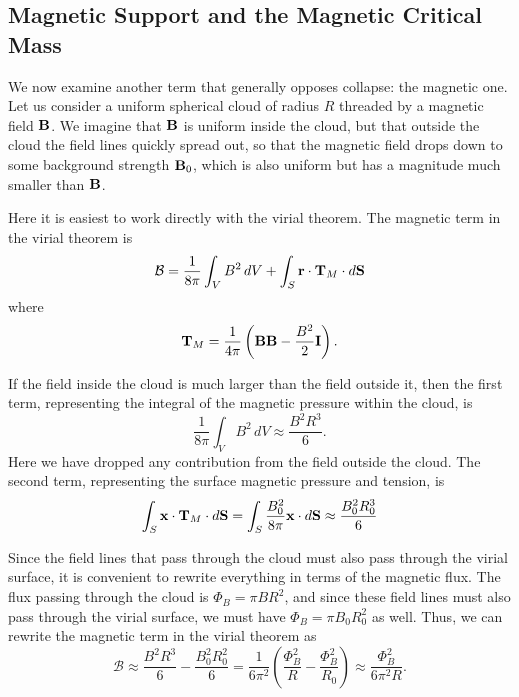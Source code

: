 \subsection{Magnetic Support and the Magnetic Critical Mass}

We now examine another term that generally opposes collapse: the magnetic one. Let us consider a uniform spherical cloud of radius $R$ threaded by a magnetic field $\mathbf{B}$. We imagine that $\mathbf{B}$ is uniform inside the cloud, but that outside the cloud the field lines quickly spread out, so that the magnetic field drops down to some background strength $\mathbf{B}_0$, which is also uniform but has a magnitude much smaller than $\mathbf{B}$.

Here it is easiest to work directly with the virial theorem. The magnetic term in the virial theorem is
\begin{equation}
\mathcal{B} = \frac{1}{8\pi} \int_V B^2 \,dV + \int_S \mathbf{r} \cdot \mathbf{T}_M \cdot d\mathbf{S}
\end{equation}
where
\begin{equation}
\mathbf{T}_M = \frac{1}{4\pi} \left(\mathbf{B}\mathbf{B} - \frac{B^2}{2}\mathbf{I}\right).
\end{equation}

If the field inside the cloud is much larger than the field outside it, then the first term, representing the integral of the magnetic pressure within the cloud, is
\begin{equation}
\frac{1}{8\pi} \int_V B^2\, dV \approx \frac{B^2 R^3}{6}.
\end{equation}
Here we have dropped any contribution from the field outside the cloud. The second term, representing the surface magnetic pressure and tension, is
\begin{equation}
\int_S \mathbf{x} \cdot \mathbf{T}_M \cdot d\mathbf{S} = \int_S \frac{B_0^2}{8\pi} \mathbf{x} \cdot d\mathbf{S}
\approx \frac{B_0^2 R_0^3}{6}
\end{equation}

Since the field lines that pass through the cloud must also pass through the virial surface, it is convenient to rewrite everything in terms of the magnetic flux. The flux passing through the cloud is $\Phi_B = \pi B R^2$, and since these field lines must also pass through the virial surface, we must have $\Phi_B = \pi B_0 R_0^2$ as well. Thus, we can rewrite the magnetic term in the virial theorem as
\begin{equation}
\mathcal{B} \approx \frac{B^2 R^3}{6} - \frac{B_0^2 R_0^2}{6} = \frac{1}{6\pi^2} \left(\frac{\Phi_B^2}{R} - \frac{\Phi_B^2}{R_0}\right) \approx \frac{\Phi_B^2}{6\pi^2 R}.
\end{equation}

